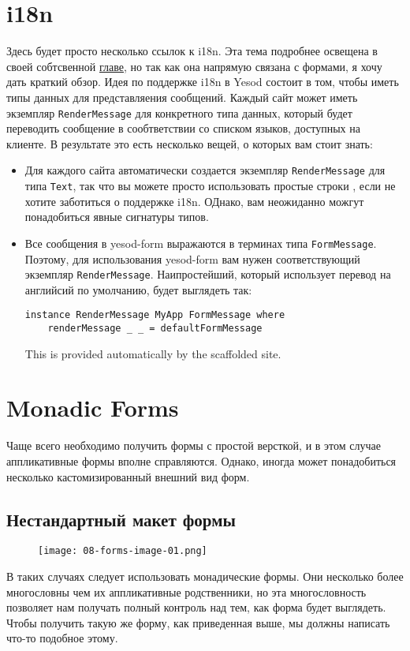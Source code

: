 \section{i18n}
Здесь будет просто несколько ссылок к i18n. Эта тема подробнее освещена в своей
собтсвенной  \hyperref[ch:i18n]{главе},
но так как она напрямую связана с формами, я хочу дать краткий обзор. 
Идея по поддержке i18n в Yesod состоит в том, чтобы иметь типы данных для представляения
сообщений. Каждый сайт может иметь экземпляр \lstinline'RenderMessage' для конкретного
типа данных, который будет переводить сообщение в сообтветствии со списком языков,
доступных на клиенте. В результате это есть несколько вещей, о которых вам стоит знать:
\begin{itemize}
\item  Для каждого сайта автоматически создается экземпляр \lstinline'RenderMessage' для
типа \lstinline'Text', так что вы можете просто использовать простые строки , если не
хотите заботиться о поддержке i18n. ОДнако, вам неожиданно можгут понадобиться явные
сигнатуры типов.
\item Все сообщения в yesod-form выражаются в терминах типа \lstinline'FormMessage'.
Поэтому, для использования yesod-form вам нужен соответствующий экземпляр 
\lstinline'RenderMessage'. Наипростейший, который использует перевод на английсий по
умолчанию, будет выглядеть так:
\begin{lstlisting}
instance RenderMessage MyApp FormMessage where
    renderMessage _ _ = defaultFormMessage
\end{lstlisting}
This is provided automatically by the scaffolded site.
\end{itemize}

\section{Monadic Forms}
Чаще всего необходимо получить формы с простой версткой, и в этом случае аппликативные формы 
вполне справляются. Однако, иногда может понадобиться несколько кастомизированный 
внешний вид форм.

\subsection{Нестандартный макет формы}
\begin{remark}
\begin{figure}[tbph]
  \centering
  \caption{}
  \texttt{[image: 08-forms-image-01.png]}
\end{figure}
\end{remark}
В таких случаях следует использовать монадические формы. Они несколько более 
многословны чем их аппликативные родственники, но эта многословность позволяет нам
получать полный контроль над тем, как форма будет выглядеть. Чтобы получить такую же
форму, как приведенная выше, мы должны написать что-то подобное этому.

